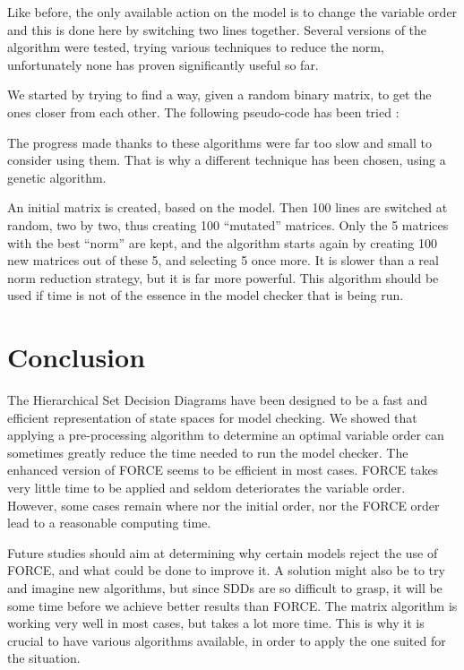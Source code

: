 \documentclass[12pt]{report}
\begin{document}
Like before, the only available action on the model is to change the variable order and this is done here by switching two lines together. Several versions of the algorithm were tested, trying various techniques to reduce the norm, unfortunately none has proven significantly useful so far. 

We started by trying to find a way, given a random binary matrix, to get the ones closer from each other. The following pseudo-code has been tried :



The progress made thanks to these algorithms were far too slow and small to consider using them. That is why a different technique has been chosen, using a genetic algorithm. 

An initial matrix is created, based on the model. Then 100 lines are switched at random, two by two, thus creating 100 \enquote{mutated} matrices. Only the 5 matrices with the best \enquote{norm} are kept, and the algorithm starts again by creating 100 new matrices out of these 5, and selecting 5 once more. It is slower than a real norm reduction strategy, but it is far more powerful. This algorithm should be used if time is not of the essence in the model checker that is being run.

\newpage
\section*{Conclusion} %

The Hierarchical Set Decision Diagrams have been designed to be a fast and efficient representation of state spaces for model checking. We showed that applying a pre-processing algorithm to determine an optimal variable order can sometimes greatly reduce the time needed to run the model checker. The enhanced version of FORCE seems to be efficient in most cases. FORCE takes very little time to be applied and seldom deteriorates the variable order. However, some cases remain where nor the initial order, nor the FORCE order lead to a reasonable computing time.

Future studies should aim at determining why certain models reject the use of FORCE, and what could be done to improve it. A solution might also be to try and imagine new algorithms, but since SDDs are so difficult to grasp, it will be some time before we achieve better results than FORCE. The matrix algorithm is working very well in most cases, but takes a lot more time. This is why it is crucial to have various algorithms available, in order to apply the one suited for the situation.

\printbibliography
\end{document}
